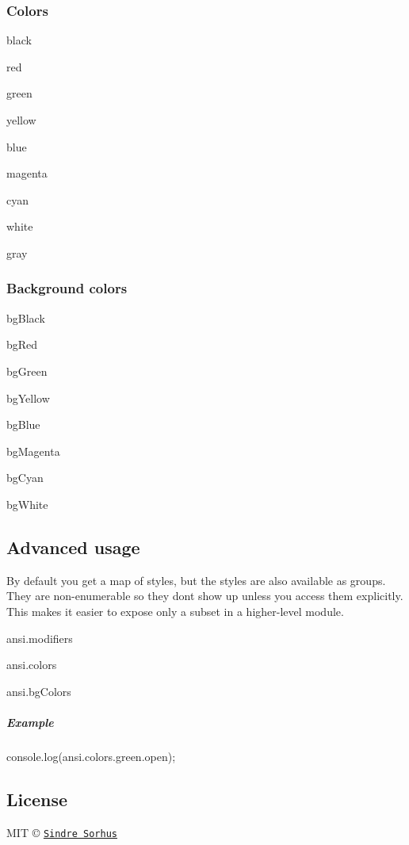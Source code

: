 \subsubsection*{Colors}


\begin{DoxyItemize}
\item {\ttfamily black}
\item {\ttfamily red}
\item {\ttfamily green}
\item {\ttfamily yellow}
\item {\ttfamily blue}
\item {\ttfamily magenta}
\item {\ttfamily cyan}
\item {\ttfamily white}
\item {\ttfamily gray}
\end{DoxyItemize}

\subsubsection*{Background colors}


\begin{DoxyItemize}
\item {\ttfamily bg\+Black}
\item {\ttfamily bg\+Red}
\item {\ttfamily bg\+Green}
\item {\ttfamily bg\+Yellow}
\item {\ttfamily bg\+Blue}
\item {\ttfamily bg\+Magenta}
\item {\ttfamily bg\+Cyan}
\item {\ttfamily bg\+White}
\end{DoxyItemize}

\subsection*{Advanced usage}

By default you get a map of styles, but the styles are also available as groups. They are non-\/enumerable so they don\textquotesingle{}t show up unless you access them explicitly. This makes it easier to expose only a subset in a higher-\/level module.


\begin{DoxyItemize}
\item {\ttfamily ansi.\+modifiers}
\item {\ttfamily ansi.\+colors}
\item {\ttfamily ansi.\+bg\+Colors}
\end{DoxyItemize}

\subparagraph*{Example}


\begin{DoxyCode}
console.log(ansi.colors.green.open);
\end{DoxyCode}


\subsection*{License}

M\+IT © \href{http://sindresorhus.com}{\tt Sindre Sorhus} 